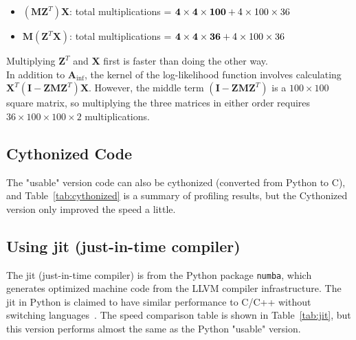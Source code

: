 \begin{itemize} 
\item $(\mathbf{M}\mathbf{Z}^T) \mathbf{X}$: total multiplications = ${\bf{4 \times 4 \times 100}} + 4 \times 100 \times 36$
\item $\mathbf{M} (\mathbf{Z}^T\mathbf{X})$: total multiplications = ${\bf{4 \times 4 \times 36}} + 4 \times 100 \times 36$
\end{itemize}
Multiplying $\mathbf{Z}^T$ and $\mathbf{X}$ first is faster than doing the other way.\\

In addition to $\mathbf{A}_{\text{inf}}$, the kernel of the log-likelihood function involves calculating $\mathbf{X}^T (\mathbf{I} - \mathbf{Z}\mathbf{M}\mathbf{Z}^T)\mathbf{X}$. However, the middle term $(\mathbf{I} - \mathbf{Z}\mathbf{M}\mathbf{Z}^T)$ is a $100 \times 100$ square matrix, so multiplying the three matrices in either order requires $36 \times 100 \times 100 \times 2$ multiplications.

\subsection{Cythonized Code}
The "usable" version code can also be cythonized (converted from Python to C), and Table~\ref{tab:cythonized} is a summary of profiling results, but the Cythonized version only improved the speed a little.

\subsection{Using jit (just-in-time compiler)}

The jit (just-in-time compiler) is from the Python package \texttt{numba}, which generates optimized machine code from the LLVM compiler infrastructure. The jit in Python is claimed to have similar performance to C/C++ without switching languages~\cite{numba}. The speed comparison table is shown in Table~\ref{tab:jit}, but this version performs almost the same as the Python "usable" version.


